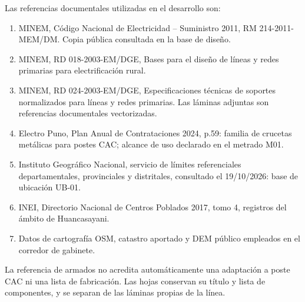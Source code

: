 Las referencias documentales utilizadas en el desarrollo son:
\begin{enumerate}
\item MINEM, Código Nacional de Electricidad -- Suministro 2011, RM 214-2011-MEM/DM. Copia pública consultada en la base de diseño.
\item MINEM, RD 018-2003-EM/DGE, Bases para el diseño de líneas y redes primarias para electrificación rural.
\item MINEM, RD 024-2003-EM/DGE, Especificaciones técnicas de soportes normalizados para líneas y redes primarias. Las láminas adjuntas son referencias documentales vectorizadas.
\item Electro Puno, Plan Anual de Contrataciones 2024, p.59: familia de crucetas metálicas para postes CAC; alcance de uso declarado en el metrado M01.
\item Instituto Geográfico Nacional, servicio de límites referenciales departamentales, provinciales y distritales, consultado el 19/10/2026: base de ubicación UB-01.
\item INEI, Directorio Nacional de Centros Poblados 2017, tomo 4, registros del ámbito de Huancasayani.
\item Datos de cartografía OSM, catastro aportado y DEM público empleados en el corredor de gabinete.
\end{enumerate}
La referencia de armados no acredita automáticamente una adaptación a poste CAC ni una lista de fabricación. Las hojas conservan su título y lista de componentes, y se separan de las láminas propias de la línea.
